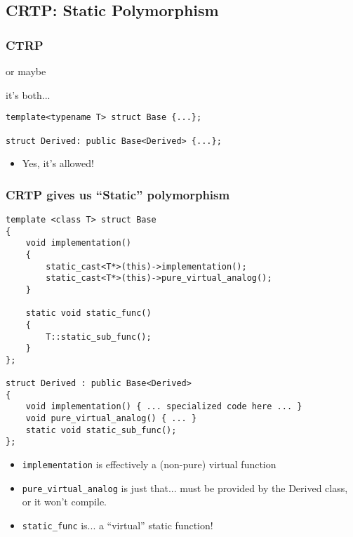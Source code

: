 \subsection{CRTP: Static Polymorphism}


\begin{frame}[fragile,t]
\frametitle{CTRP}
\begin{center} \end{center}
\begin{center}or maybe  \end{center}
\begin{center} \end{center}
\begin{center}it's both...  \end{center}

{\scriptsize\begin{verbatim}
template<typename T> struct Base {...};

struct Derived: public Base<Derived> {...};
\end{verbatim}
}
\begin{itemize}[<+->]
\item Yes, it's allowed!
\end{itemize}
\end{frame}

\begin{frame}[fragile,t]
\frametitle{CRTP gives us ``Static'' polymorphism}
{\scriptsize\begin{verbatim}
template <class T> struct Base
{
    void implementation()
    {
        static_cast<T*>(this)->implementation();
        static_cast<T*>(this)->pure_virtual_analog();
    }

    static void static_func()
    {
        T::static_sub_func();
    }
};

struct Derived : public Base<Derived>
{
    void implementation() { ... specialized code here ... }
    void pure_virtual_analog() { ... }
    static void static_sub_func();
};
\end{verbatim}
}
\pause
\begin{itemize}[<+->]
\item \texttt{implementation} is effectively a (non-pure) virtual function
\item \texttt{pure\_virtual\_analog} is just that... must be provided
  by the Derived class, or it won't compile.
\item \texttt{static\_func} is... a ``virtual'' static function! 
\end{itemize}
\end{frame}

